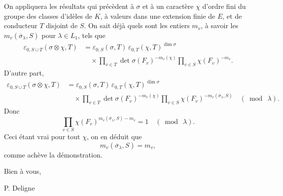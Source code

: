\documentclass[11pt]{article}
\newcommand{\eps}{\varepsilon}
\begin{document}
On appliquera les résultats qui précèdent à \(\sigma\) et à un caractère \(\chi\) d'ordre fini du groupe des classes d'idèles de \(K\), à valeurs dans une extension finie de \(E\), et de conducteur \(T\) disjoint de \(S\). On sait déjà quels sont les entiers \(m_v\), à savoir les \(m_v(\overline{\sigma}_\lambda,S)\) pour \(\lambda\in L_1\), tels que
\[
\begin{aligned}
\eps_{0,S\cup T}(\sigma\otimes\chi,T)
&=\eps_{0,S}(\sigma,T)\,
  \eps_{0,T}(\chi,T)^{\dim\sigma} \\
&\quad\times
\prod_{v\in T}\det\sigma(F_v)^{-m_v(\chi)}
\prod_{v\in S}\chi(F_v)^{-m_v}.
\end{aligned}
\]
D'autre part,
\[
\begin{aligned}
\eps_{0,S\cup T}(\sigma\otimes\chi,T)
&=\eps_{0,S}(\sigma,T)\,
  \eps_{0,T}(\chi,T)^{\dim\sigma} \\
&\quad\times
\prod_{v\in T}\det\sigma(F_v)^{-m_v(\chi)}
\prod_{v\in S}\chi(F_v)^{-m_v(\overline{\sigma}_\lambda,S)}
\quad(\bmod\ \lambda).
\end{aligned}
\]
Donc
\[
\prod_{v\in S}\chi(F_v)^{m_v(\overline{\sigma}_\lambda,S)-m_v}
=1\quad(\bmod\ \lambda).
\]
Ceci étant vrai pour tout \(\chi\), on en déduit que
\[
m_v(\overline{\sigma}_\lambda,S)=m_v,
\]
comme achève la démonstration.

Bien à vous,

\hfill P. Deligne
\end{document}
